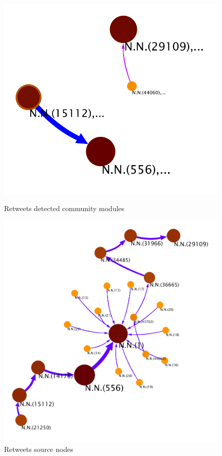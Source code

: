 \begin{figure}[ht]
\centering
\begin{minipage}[b]{0.45\linewidth}
\includegraphics[scale=0.40]{Images/retweets_modules.pdf}
\caption{Retweets detected community modules}
\label{fig:minipage1}
\end{minipage}
\quad
\begin{minipage}[b]{0.45\linewidth}
\includegraphics[scale=0.40]{Images/retweets_source_nodes.pdf}
\caption{Retweets source nodes}
\label{fig:minipage2}
\end{minipage}
\end{figure}

